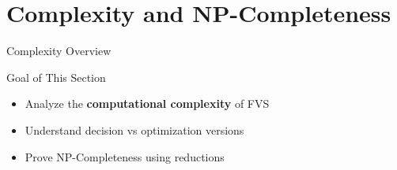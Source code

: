 \documentclass[aspectratio=169]{beamer}
\begin{document}












\section{Complexity and NP-Completeness}

\begin{frame}{Complexity Overview}

	\begin{block}{Goal of This Section}
		\begin{itemize}
			\item Analyze the \textbf{computational complexity} of FVS
			\item Understand decision vs optimization versions
			\item Prove NP-Completeness using reductions
		\end{itemize}
	\end{block}

\end{frame}
\end{document}
